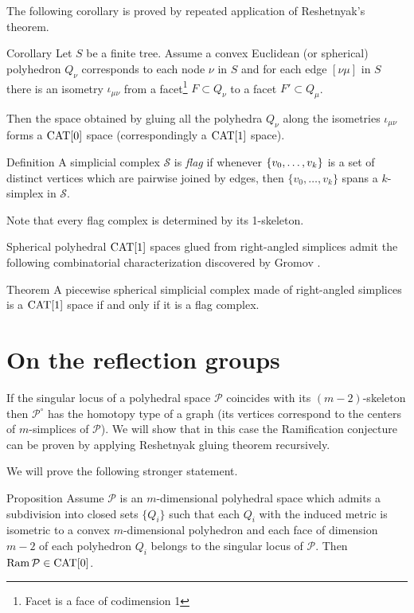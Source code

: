 \documentclass{compositio}
\begin{document}
The following corollary is proved by repeated application of Reshetnyak's theorem.


\begin{thm}{Corollary}\label{cor:resh}
Let $S$ be a finite tree.
Assume a convex Euclidean (or spherical) polyhedron $Q_\nu$
corresponds to each node $\nu$ in $S$
and for each edge $[\nu\mu]$ in $S$
there is an isometry $\iota_{\mu\nu}$
from a facet\footnote{Facet is a face of codimension 1} $F\subset Q_\nu$ to a facet $F'\subset Q_\mu$.

Then the space obtained by gluing all the polyhedra $Q_\nu$ along the isometries $\iota_{\mu\nu}$ forms a $\mathrm{CAT}[0]$ space (correspondingly a $\mathrm{CAT}[1]$ space).
\end{thm}


\begin{thm}{Definition}
A simplicial complex $\mathcal{S}$ is \emph{flag} if whenever $\{v_0,\z\dots,v_k\}$
is a set of distinct vertices which are pairwise joined by edges, then $\{v_0,\dots,v_k\}$
spans a $k$-simplex in $\mathcal{S}$.
\end{thm}

Note that every flag complex is determined by its 1-skeleton.

Spherical polyhedral $\mathrm{CAT}[1]$ spaces glued from right-angled simplices
admit the following combinatorial characterization discovered by Gromov \cite[p. 122]{gromov-hyp-group}.

\begin{thm}{Theorem}
 A piecewise spherical simplicial complex made of right-angled simplices is a $\mathrm{CAT}[1]$ space if and only if it is a flag complex.
\end{thm}



\section{On the reflection groups}

If the singular locus of a polyhedral space $\mathcal{P}$ coincides with its $(m-2)$-skeleton
then $\mathcal{P}^\circ$ has the homotopy type of a graph 
(its vertices correspond to the centers of $m$-simplices of $\mathcal{P}$).
We will show that in this case the Ramification conjecture can be proven by applying Reshetnyak gluing theorem recursively.

We will prove the following stronger statement.

\begin{thm}{Proposition}\label{prop:ramresh}
Assume $\mathcal{P}$ is an $m$-dimensional polyhedral space which
admits a subdivision into closed sets $\{Q_i\}$
such that each $Q_i$ with the induced metric is isometric to a convex $m$-dimensional polyhedron and each face  of dimension $m-2$ of each polyhedron $Q_i$ belongs to the singular locus of $\mathcal{P}$.
Then $\mathop{\rm Ram}\nolimits \mathcal{P}\in\mathrm{CAT}[0]$.
\end{thm}
\end{document}
